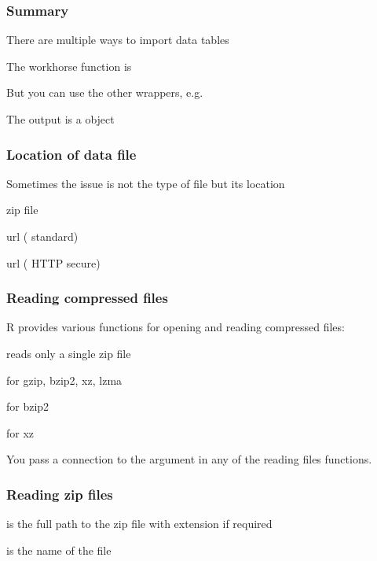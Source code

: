 \documentclass[12pt]{beamer}\usepackage[]{graphicx}\usepackage[]{color}
\begin{document}
\begin{frame}
\frametitle{Summary}

\bi
  \item There are multiple ways to import data tables
  \item The workhorse function is 
  \item But you can use the other wrappers, e.g. 
  \item The output is a  object
\ei
\eb

\end{frame}


\begin{frame}
\frametitle{Location of data file}

Sometimes the issue is not the type of file but its location
\bbi
  \item zip file
  \item url ( standard)
  \item url ( HTTP secure)
\ei

\end{frame}


\begin{frame}
\frametitle{Reading compressed files}

R provides various  functions for opening and reading compressed files:
\bi
  \item {} reads only a single zip file
  \item {} for gzip, bzip2, xz, lzma
  \item {} for bzip2
  \item {} for xz
\ei

You pass a connection to the argument  in any of the reading files functions.

\end{frame}


\begin{frame}
\frametitle{Reading zip files}


\bi
  \item {} is the full path to the zip file
  with  extension if required
  \item {} is the name of the file
\ei

\end{frame}
\end{document}
